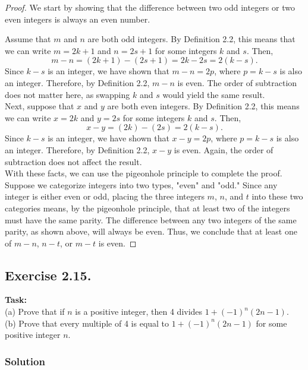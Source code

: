 \documentclass{article}
\begin{document}
\begin{proof}
    We start by showing that the difference between two odd integers or two even integers is always an even number.

    Assume that $m$ and $n$ are both odd integers. By Definition 2.2, this means that we can write $m = 2k + 1$ and $n = 2s + 1$ for some integers $k$ and $s$. Then,
    \[
    m - n = (2k + 1) - (2s + 1) = 2k - 2s = 2(k - s).
    \]
    Since $k - s$ is an integer, we have shown that $m - n = 2p$, where $p = k - s$ is also an integer. Therefore, by Definition 2.2, $m - n$ is even. The order of subtraction does not matter here, as swapping $k$ and $s$ would yield the same result.\\

    Next, suppose that $x$ and $y$ are both even integers. By Definition 2.2, this means we can write $x = 2k$ and $y = 2s$ for some integers $k$ and $s$. Then,
    \[
    x - y = (2k) - (2s) = 2(k - s).
    \]
    Since $k - s$ is an integer, we have shown that $x - y = 2p$, where $p = k - s$ is also an integer. Therefore, by Definition 2.2, $x - y$ is even. Again, the order of subtraction does not affect the result.\\

    With these facts, we can use the pigeonhole principle to complete the proof. Suppose we categorize integers into two types, "even" and "odd." Since any integer is either even or odd, placing the three integers $m$, $n$, and $t$ into these two categories means, by the pigeonhole principle, that at least two of the integers must have the same parity. The difference between any two integers of the same parity, as shown above, will always be even. Thus, we conclude that at least one of $m - n$, $n - t$, or $m - t$ is even.
\end{proof}

\newpage

\subsection{Exercise 2.15.}
\textbf{Task:} \\
(a) Prove that if $n$ is a positive integer, then 4 divides $1+(-1)^n(2n-1)$.\\
(b) Prove that every multiple of 4 is equal to $1+(-1)^n(2n-1)$ for some positive integer $n$.

\subsubsection*{Solution}
\end{document}
